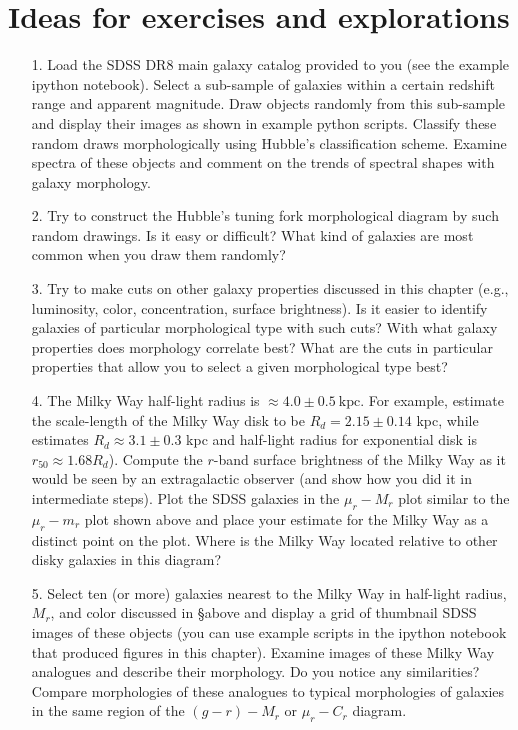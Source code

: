 \section{Ideas for exercises and explorations}

\begin{itemize}
\item[1.] Load the SDSS DR8 main galaxy catalog provided to you (see the example ipython notebook). Select a sub-sample of galaxies within a certain redshift range and apparent magnitude. Draw objects randomly from this sub-sample and display their images as shown in example python scripts. Classify these random draws morphologically using Hubble's classification scheme. Examine spectra of these objects and comment on the trends of spectral shapes with galaxy morphology. 
\item[2.] Try to construct the Hubble's tuning fork morphological diagram by such random drawings. Is it easy or difficult? What kind of galaxies are most common when you draw them randomly? 
\item[3.] Try to make cuts on other galaxy properties discussed in this chapter (e.g., luminosity, color, concentration, surface brightness). Is it easier to identify galaxies of particular morphological type with such cuts? With what galaxy properties does morphology correlate best?
What are the cuts in particular properties that allow you to select a given morphological type best?
\item[4.] The Milky Way half-light radius is $\approx 4.0\pm 0.5\ \mathrm{kpc}$. For example, \href{http://adsabs.harvard.edu/abs/2013ApJ...779..115B}{\citet{bovy_rix13}} estimate the scale-length of the Milky Way disk to be $R_d=2.15\pm 0.14$ kpc, while \href{http://adsabs.harvard.edu/abs/2011MNRAS.414.2446M}{\citet{mcmillan11}}  estimates $R_d\approx 3.1\pm 0.3$ kpc and half-light radius for exponential disk is $r_{50}\approx 1.68R_d$). Compute the $r$-band surface brightness of the Milky Way as it would be seen by an extragalactic observer (and show how you did it in intermediate steps). Plot the SDSS galaxies in the $\mu_r-M_r$ plot similar to the $\mu_r-m_r$ plot shown above and place your estimate for the Milky Way as a distinct point on the plot. Where is the Milky Way located relative to other disky galaxies in this diagram? 
\item[5.] Select ten (or more) galaxies nearest to the Milky Way in half-light radius, $M_r$, and color discussed in \S above and 
display a grid of thumbnail SDSS images of these objects (you can use example scripts in the ipython notebook that produced figures in this chapter). Examine images of these Milky Way analogues and describe their morphology. Do you notice any similarities? Compare morphologies of these analogues to typical morphologies of galaxies in the same region of the $(g-r)-M_r$ or $\mu_r-C_r$ diagram.
\end{itemize}

